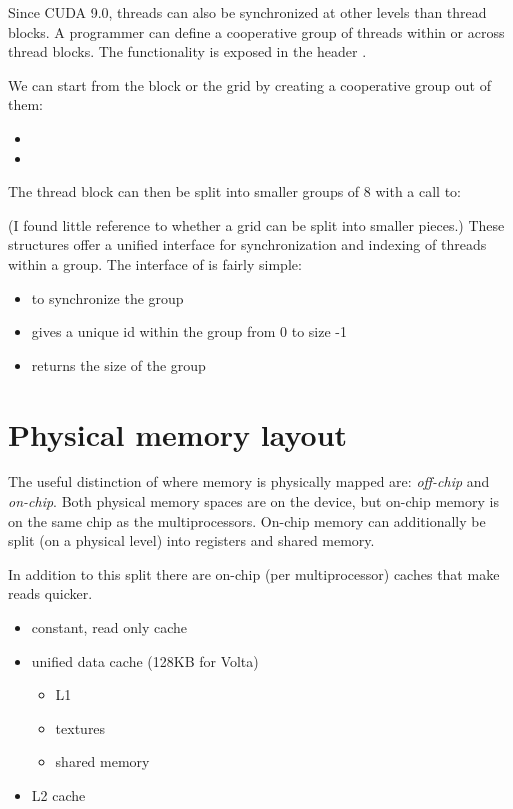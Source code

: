 \documentclass[a4paper,titlepage,12pt]{article}
\begin{document}
\begin{description}[left = \parindent]
Since CUDA 9.0, threads can also be synchronized at other levels than thread blocks.
A programmer can define a cooperative group of threads within or across thread blocks.
The functionality is exposed in the header .

\noindent We can start from the block or the grid by creating a cooperative group out of them:

\begin{itemize}
	\item {}
	\item {}
\end{itemize}

\noindent The thread block can then be split into smaller groups of 8 with a call to:
\begin{center}
\end{center}

\noindent (I found little reference to whether a grid can be split into smaller pieces.)
These structures offer a unified interface for synchronization and indexing of threads within a group.
The interface of  is fairly simple:
\begin{itemize}
	\item {} to synchronize the group
	\item {} gives a unique id within the group from 0 to size -1
	\item {} returns the size of the group
\end{itemize}

\newpage
\section{Physical memory layout}

The useful distinction of where memory is physically mapped are: {\em off-chip} and {\em on-chip}.
Both physical memory spaces are on the device, but on-chip memory is on the same chip as the multiprocessors.
On-chip memory can additionally be split (on a physical level) into registers and shared memory.

In addition to this split there are on-chip (per multiprocessor) caches that make reads quicker.
\begin{itemize}
	\item constant, read only cache
	\item unified data cache (128KB for Volta)
	\begin{itemize}
		\item L1
		\item textures
		\item shared memory
	\end{itemize}
	\item L2 cache
\end{itemize}


\end{description}
\end{document}
